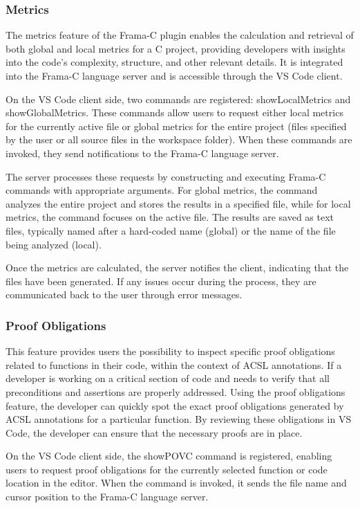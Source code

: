 \documentclass[10pt]{article}
\begin{document}
\begin{singlespace}
\subsubsection{Metrics}
The metrics feature of the Frama-C plugin enables the calculation and retrieval of both global and local metrics for a C project, providing developers with insights into the code’s complexity, structure, and other relevant details. It is integrated into the Frama-C language server and is accessible through the VS Code client.

On the VS Code client side, two commands are registered: showLocalMetrics and showGlobalMetrics. These commands allow users to request either local metrics for the currently active file or global metrics for the entire project (files specified by the user or all source files in the workspace folder). When these commands are invoked, they send notifications to the Frama-C language server.

The server processes these requests by constructing and executing Frama-C commands with appropriate arguments. For global metrics, the command analyzes the entire project and stores the results in a specified file, while for local metrics, the command focuses on the active file. The results are saved as text files, typically named after a hard-coded name (global) or the name of the file being analyzed (local).

Once the metrics are calculated, the server notifies the client, indicating that the files have been generated. If any issues occur during the process, they are communicated back to the user through error messages.

\subsubsection{Proof Obligations}
This feature provides users the possibility to inspect specific proof obligations related to functions in their code, within the context of ACSL annotations. If a developer is working on a critical section of code and needs to verify that all preconditions and assertions are properly addressed. Using the proof obligations feature, the developer can quickly spot the exact proof obligations generated by ACSL annotations for a particular function. By reviewing these obligations in VS Code, the developer can ensure that the necessary proofs are in place.

On the VS Code client side, the showPOVC command is registered, enabling users to request proof obligations for the currently selected function or code location in the editor. When the command is invoked, it sends the file name and cursor position to the Frama-C language server.


\end{singlespace}
\end{document}
